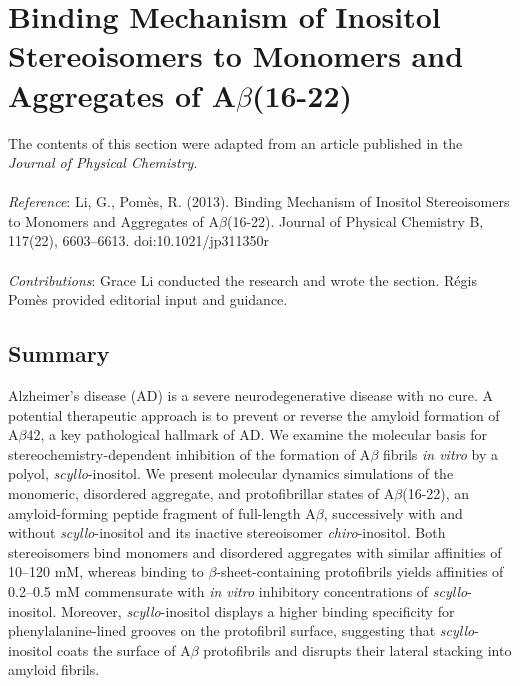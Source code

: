 \chapter[Binding of Inositol Stereoisomers to A$\beta$(16-22)]
{Binding Mechanism of Inositol Stereoisomers to Monomers and Aggregates of A$\beta$(16-22)}

The contents of this section were adapted from an article published in the \emph{Journal of Physical Chemistry}.
\\
\\
\emph{Reference}:
Li, G., Pom\`{e}s, R. (2013). Binding Mechanism of Inositol Stereoisomers to Monomers and Aggregates of A$\beta$(16-22). Journal of Physical Chemistry B, 117(22), 6603–6613. doi:10.1021/jp311350r
\\
\\
\emph{Contributions}:
Grace Li conducted the research and wrote the section. R\'{e}gis Pom\`{e}s provided editorial input and guidance.

\newpage

\section{Summary}
Alzheimer's disease (AD) is a severe neurodegenerative disease with no cure. A potential therapeutic approach is to prevent or reverse the amyloid formation of A$\beta$42, a key pathological hallmark of AD. We examine the molecular basis for stereochemistry-dependent inhibition of the formation of A$\beta$ fibrils \emph{in vitro} by a polyol,  \emph{scyllo}-inositol. We present molecular dynamics simulations of the monomeric, disordered aggregate, and protofibrillar states of A$\beta$(16-22), an amyloid-forming peptide fragment of full-length A$\beta$, successively with and without \emph{scyllo}-inositol and its inactive stereoisomer \emph{chiro}-inositol. Both stereoisomers bind monomers and disordered aggregates with similar affinities of 10--120 mM, whereas binding to $\beta$-sheet-containing protofibrils yields affinities of 0.2--0.5 mM commensurate with \emph{in vitro} inhibitory concentrations of \emph{scyllo}-inositol. Moreover,  \emph{scyllo}-inositol displays a higher binding specificity for phenylalanine-lined grooves on the protofibril surface, suggesting that  \emph{scyllo}-inositol coats the surface of A$\beta$ protofibrils and disrupts their lateral stacking into amyloid fibrils.\\


